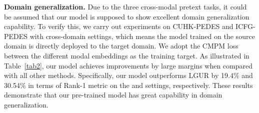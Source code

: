 \documentclass[10pt,twocolumn,letterpaper]{article}
\begin{document}
\noindent\textbf{Domain generalization.} Due to the three cross-modal pretext tasks, it could be assumed that our model is supposed to show excellent domain generalization capability. To verify this, we carry out experiments on CUHK-PEDES and ICFG-PEDES with cross-domain settings, which means the model trained on the source domain is directly deployed to the target domain. We adopt the CMPM loss between the different modal embeddings as the training target. As illustrated in Table~\ref{tab2}, our model achieves improvements by large margins when compared with all other methods. Specifically, our model outperforms LGUR by 19.4\% and 30.54\% in terms of Rank-1 metric on the  and  settings, respectively. These results demonstrate that our pre-trained model has great capability in domain generalization.
\begin{table}[t]
\centering
\caption{Comparison on domain generalization. ``C" and ``I" denote CUHK-PEDES and ICFG-PEDES, respectively.}
\label{tab2}
\end{table}
\end{document}
